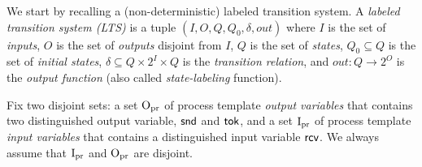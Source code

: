 We start by recalling a (non-deterministic) labeled transition system.
A \emph{labeled transition system (LTS)}
is a tuple
$(I,O,Q,Q_0,\delta,out)$
where
 $I$ is the set of {\em inputs},
 $O$ is the set of {\em outputs} disjoint from $I$,
 $Q$ is the set of {\em states},
 $Q_0 \subseteq Q$ is the set of {\em initial states},
 $\delta \subseteq Q \times 2^I \times Q$ is the {\em transition relation},
 and $out:Q \to 2^O$ is the \emph{output function} (also called {\em state-labeling} function).

Fix two disjoint sets:
a set ${\mathrm{O}_{\mathrm{pr}}}$ of process template \emph{output variables} that contains two distinguished output variable,
$\mathsf{snd}$ and $\mathsf{tok}$,
and a set ${\mathrm{I}_{\mathrm{pr}}}$ of process template \emph{input variables} that contains a distinguished input variable $\mathsf{rcv}$.
We always assume that ${\mathrm{I}_{\mathrm{pr}}}$ and ${\mathrm{O}_{\mathrm{pr}}}$ are disjoint.


